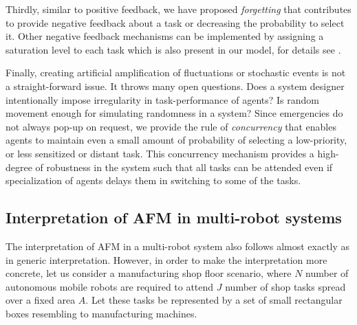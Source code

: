 \documentclass[preprint,12pt]{elsarticle}
\begin{document}
Thirdly, similar to positive feedback, we have proposed {\em forgetting} that contributes to provide negative feedback about a task or decreasing the probability to select it. Other negative feedback mechanisms can be implemented by assigning a saturation level to each task which is also present in our model, for details see \citet{Arcaute+2008}.

Finally, creating  artificial amplification of fluctuations or stochastic events is not a straight-forward issue. It throws  many open questions. Does a system designer intentionally impose irregularity in task-performance of agents?  Is random movement  enough for simulating randomness in a system?
Since emergencies do not always pop-up on request, we provide the rule of {\em concurrency} that enables agents to  maintain even a small amount of probability of selecting a low-priority, or less sensitized or distant task. This concurrency mechanism provides a high-degree of robustness in the system such that all tasks can be attended even if specialization of agents delays them in switching to some of the tasks.
\subsection{Interpretation of AFM in multi-robot systems}
\label{afm:mrs-interpretation}
The interpretation of AFM in a multi-robot system also follows almost exactly as in generic interpretation. However, in order to make the interpretation more concrete, let us consider a manufacturing shop floor scenario, where $N$ number of autonomous mobile robots are required to attend $J$ number of shop tasks spread over a fixed area $A$. Let these tasks be represented by a set of small rectangular boxes resembling to manufacturing machines.
\end{document}
